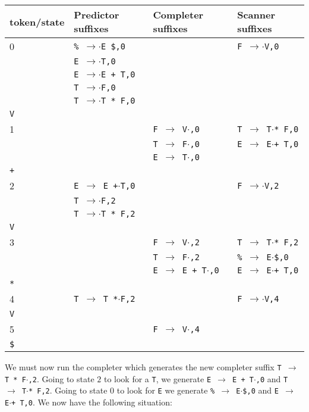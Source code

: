\documentclass[11pt]{article}
\def\ra{\rightarrow}
\begin{document}
\begin{tabular}{|l|l|l|l|}
\hline
token/state & Predictor suffixes & Completer suffixes & Scanner suffixes\\
\hline
0     & \texttt{\% $\ra$$\cdot$E \$,0} & & \texttt{F $\ra$$\cdot$V,0}\\
      & \texttt{E $\ra$$\cdot$T,0} & & \\
      & \texttt{E $\ra$$\cdot$E + T,0} & & \\
      & \texttt{T $\ra$$\cdot$F,0} & & \\
      & \texttt{T $\ra$$\cdot$T * F,0} & & \\
\hline
\texttt{V} &  & &\\
\hline
1     &  & \texttt{F $\ra$ V$\cdot$,0}& \texttt{T $\ra$ T$\cdot$* F,0} \\
      &  & \texttt{T $\ra$ F$\cdot$,0}& \texttt{E $\ra$ E$\cdot$+ T,0} \\
      &  & \texttt{E $\ra$ T$\cdot$,0}& \\
\hline
\texttt{+} &  & &\\
\hline
2     & \texttt{E $\ra$ E +$\cdot$T,0} & & \texttt{F $\ra$$\cdot$V,2}\\
      & \texttt{T $\ra$$\cdot$F,2} & & \\
      & \texttt{T $\ra$$\cdot$T * F,2} & & \\
\hline 
\texttt{V} & & &\\
\hline
3     &  &  \texttt{F $\ra$ V$\cdot$,2}& \texttt{T $\ra$ T$\cdot$* F,2}\\
      &  &  \texttt{T $\ra$ F$\cdot$,2}& \texttt{\% $\ra$ E$\cdot$\$,0}\\
      &  &  \texttt{E $\ra$ E + T$\cdot$,0}& \texttt{E $\ra$ E$\cdot$+ T,0}\\
\hline
\texttt{*} & & & \\
\hline
4     & \texttt{T $\ra$ T *$\cdot$F,2} & & \texttt{F $\ra$$\cdot$V,4}\\
\hline
\texttt{V} & & &\\
\hline
5     & & \texttt{F $\ra$ V$\cdot$,4} &\\
\hline
\texttt{\$} &  & &\\
\hline
\end{tabular}

We must now run the completer which generates the new completer suffix
\texttt{T $\ra$ T * F$\cdot$,2}.  Going to state $2$ to look for a
\texttt{T}, we generate \texttt{E $\ra$ E + T$\cdot$,0} and \texttt{T
  $\ra$ T$\cdot$* F,2}.  Going to state $0$ to look for \texttt{E} we
generate \texttt{\% $\ra$ E$\cdot$\$,0} and \texttt{E $\ra$ E$\cdot$+
  T,0}.  We now have the following situation:
\end{document}
